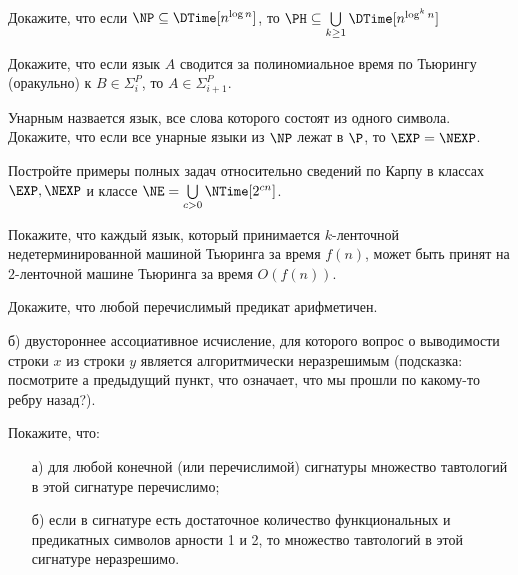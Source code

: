 

\begin{task}
	Докажите, что если $\NP \subseteq \DTime[n^{\log n}]$, то $\PH \subseteq \bigcup\limits_{k \ge 1} \DTime[n^{\log^k n}]$    
\end{task}

\begin{task}
	Докажите, что если язык $A$ сводится за полиномиальное время по Тьюрингу (оракульно) к $B \in \Sigma_i^P$, то $A \in
    \Sigma_{i + 1}^P$.    
\end{task}

\begin{task}
	Унарным назвается язык, все слова которого состоят из одного символа. Докажите, что если все унарные языки из $\NP$ лежат в
    $\P$, то $\EXP = \NEXP$. 
\end{task}

\begin{task}
	Постройте примеры полных задач относительно сведений по Карпу в классах $\EXP, \NEXP$ и классе $\NE = \bigcup\limits_{c > 0}
    \NTime[2^{cn}]$.
\end{task}




\breakline

\begin{ptask}{8}
    Покажите, что каждый язык, который принимается $k$-ленточной недетерминированной машиной Тьюринга за время $f(n)$, может быть
    принят на $2$-ленточной машине Тьюринга за время $O(f(n))$.
\end{ptask}

\begin{ptask}{23}
	Докажите, что любой перечислимый предикат арифметичен. 
\end{ptask}

\begin{ptask}{24}
	б) двустороннее ассоциативное исчисление, для которого вопрос о выводимости строки $x$ из строки $y$ является алгоритмически
    неразрешимым (подсказка: посмотрите а предыдущий пункт, что означает, что мы прошли по какому-то ребру назад?).
\end{ptask}


\begin{ptask}{25}
    Покажите, что:
    \begin{enumerate}[topsep = 0pt, itemsep = -1ex]
        \item [а)] для любой конечной (или перечислимой) сигнатуры множество тавтологий в этой сигнатуре перечислимо;
        \item [б)] если в сигнатуре есть достаточное количество функциональных и предикатных символов арности 1 и 2, то множество
		    тавтологий в этой сигнатуре неразрешимо.
    \end{enumerate}
\end{ptask}


